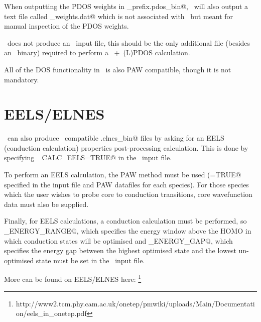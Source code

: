 \documentclass[a4paper,11pt,twoside]{book}
\begin{document}
{When outputting the PDOS weights in \verb@seedname_prefix.pdos_bin@, \onetep\  will also output a text file called \verb@pdos_weights.dat@ which is not associated with \optados\, but meant for manual inspection of the PDOS weights.

\onetep\  does not produce an \optados\ input file, this should be the only additional file (besides an \optados\ binary) required to perform a \onetep\ +\optados\ (L)PDOS calculation.

All of the DOS functionality in \onetep\  is also PAW compatible, though it is not mandatory.


\section{EELS/ELNES}

\onetep\  can also produce \optados\ compatible \verb@seedname.elnes_bin@ files by asking for an EELS\cite{tait:JPCM:2016} (conduction calculation) properties post-processing calculation. This is done by specifying \verb@COND_CALC_EELS=TRUE@ in the \onetep\ input file.

To perform an EELS calculation, the PAW method must be used (\verb@PAW=TRUE@ specified in the input file and PAW datafiles for each species). For those species which the user wishes to probe core to conduction transitions, core wavefunction data must also be supplied.

Finally, for EELS calculations, a conduction calculation must be performed, so \verb@COND_ENERGY_RANGE@, which specifies the energy window above the HOMO in which conduction states will be optimised and \verb@COND_ENERGY_GAP@, which specifies the energy gap between the highest optimised state and the lowest un-optimised state must be set in the \onetep\ input file.


More can be found on EELS/ELNES here: \footnote{http://www2.tcm.phy.cam.ac.uk/onetep/pmwiki/uploads/Main/Documentation/eels\_in\_onetep.pdf}




}
\end{document}
